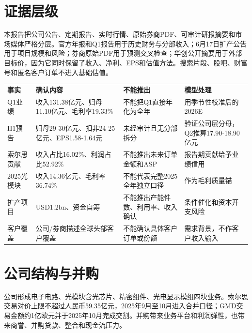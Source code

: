 
\section{证据层级}
本报告把公司公告、定期报告、实时行情、原始券商PDF、可审计研报摘要和市场媒体严格分层。官方年报和Q1报告用于历史财务与分部收入；6月17日扩产公告用于项目规模和风险；券商原始PDF用于预测交叉检查；华创公开摘要用于外部目标价，因为它同时保留了收入、净利、EPS和估值方法。搜索片段、股吧、财富号和匿名客户订单不进入基础估值。

\begin{exhibitbox}
\begin{tabularx}{\exhibitboxwidth}{L{3.0cm}X L{3.2cm}X}
\textbf{事实} & \textbf{确认内容} & \textbf{不能推出} & \textbf{模型处理} \\
Q1业绩 & 收入131.38亿元、归母11.10亿元、毛利率19.33\% & 不能把Q1直接年化为全年 & 用季节性校准后的2026E \\
H1预告 & 归母29-30亿元、扣非24-25亿元、EPS1.58-1.64元 & 未经审计且无分部拆分 & 验证公司层分母，Q2推算17.90-18.90亿元 \\
索尔思贡献 & 收入占比16.02\%、利润占比52.92\% & 不能推出未来订单金额和ASP & 报告期贡献给予业绩信用 \\
2025光模块 & 收入14.36亿元、毛利率36.74\% & 不能代表完整2025全年独立口径 & 作为毛利质量锚 \\
扩产项目 & USD1.2bn、资金自筹 & 不能推出产能件数、利用率、收入确认 & 条件催化和资本开支风险 \\
客户覆盖 & 公司/券商描述全球头部客户覆盖 & 不能确认具体客户订单或份额 & 需求背景，不作客户收入输入 \\
\end{tabularx}
\end{exhibitbox}

\section{公司结构与并购}
公司形成电子电路、光模块含光芯片、精密组件、光电显示模组四块业务。索尔思交易对价上限不超过人民币59.35亿元，2025年9月至10月进入合并口径；GMD交易金额约1亿欧元并于2025年10月完成交割。并购带来业务平台和利润弹性，也带来商誉、并购贷款、整合和现金流压力。

